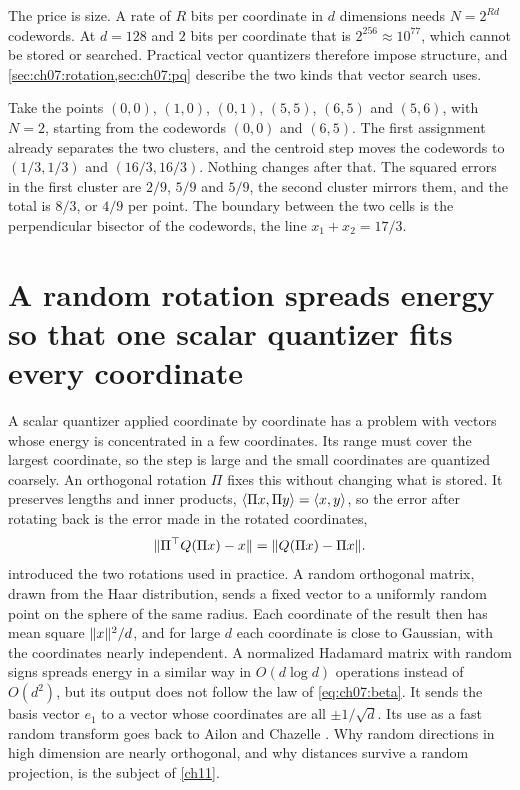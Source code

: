 The price is size. A rate of $R$ bits per coordinate in $d$ dimensions needs $N=2^{Rd}$ codewords. At $d=128$ and $2$ bits per coordinate that is $2^{256}\approx10^{77}$, which cannot be stored or searched. Practical vector quantizers therefore impose structure, and \cref{sec:ch07:rotation,sec:ch07:pq} describe the two kinds that vector search uses.

\begin{example}\label{ex:ch07:kmeans}
Take the points $(0,0)$, $(1,0)$, $(0,1)$, $(5,5)$, $(6,5)$ and $(5,6)$, with $N=2$, starting from the codewords $(0,0)$ and $(6,5)$. The first assignment already separates the two clusters, and the centroid step moves the codewords to $(1/3,1/3)$ and $(16/3,16/3)$. Nothing changes after that. The squared errors in the first cluster are $2/9$, $5/9$ and $5/9$, the second cluster mirrors them, and the total is $8/3$, or $4/9$ per point. The boundary between the two cells is the perpendicular bisector of the codewords, the line $x_1+x_2=17/3$.
\end{example}


\section{A random rotation spreads energy so that one scalar quantizer fits every coordinate}\label{sec:ch07:rotation}

A scalar quantizer applied coordinate by coordinate has a problem with vectors whose energy is concentrated in a few coordinates. Its range must cover the largest coordinate, so the step is large and the small coordinates are quantized coarsely. An orthogonal rotation $\Pi$ fixes this without changing what is stored. It preserves lengths and inner products, $\langle \Pi x,\Pi y\rangle=\langle x,y\rangle$, so the error after rotating back is the error made in the rotated coordinates,
\begin{equation}\label{eq:ch07:rot}
\lVert \Pi^{\top} Q(\Pi x)-x\rVert=\lVert Q(\Pi x)-\Pi x\rVert.
\end{equation}
 introduced the two rotations used in practice. A random orthogonal matrix, drawn from the Haar distribution, sends a fixed vector to a uniformly random point on the sphere of the same radius. Each coordinate of the result then has mean square $\lVert x\rVert^2/d$, and for large $d$ each coordinate is close to Gaussian, with the coordinates nearly independent. A normalized Hadamard matrix with random signs spreads energy in a similar way in $O(d\log d)$ operations instead of $O(d^2)$, but its output does not follow the law of \cref{eq:ch07:beta}. It sends the basis vector $e_1$ to a vector whose coordinates are all $\pm1/\sqrt d$. Its use as a fast random transform goes back to Ailon and Chazelle \cite{ailonchazelle2009}. Why random directions in high dimension are nearly orthogonal, and why distances survive a random projection, is the subject of \cref{ch11}.

